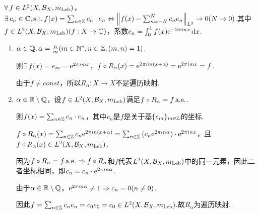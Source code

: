 \begin{instance}
    $\forall\,f\in L^2(X,\mathcal{B}_X,m_\mathrm{Leb})$，$\exists\, c_n\in\mathbb{C},\operatorname{\text{s.t.}} f(x)=\sum_{n\in\mathbb{Z}}{c_n\cdot e_n}\Leftrightarrow \left\|f(x)-\sum_{n=-N}^N{c_n e_n}\right\|_{L^2}\to 0(N\to 0)$.其中$f\in L^2(X,\mathcal{B}_X,m_\mathrm{Leb})(f:X\to\mathbb{C})$，系数$c_n=\int_0^1{f(x)\mathrm{e}^{-2\pi inx}}\mathop{}\!\mathrm{d} x$.\par
    \begin{enumerate}[(1)]
        \item $\alpha\in\mathbb{Q},\alpha=\frac{n}{m}(m\in\mathbb{N}^*,n\in\mathbb{Z},(m,n)=1)$.\par
        则$\exists\, f(x)=e_m=\mathrm{e}^{2\pi imx}$，$f\circ R_\alpha(x)=\mathrm{e}^{2\pi im(x+\alpha)}=\mathrm{e}^{2\pi imx}=f$.\par
        由于$f\neq const$，所以$R_\alpha:X\to X$不是遍历映射.
        \item $\alpha\in\mathbb{R}\setminus\mathbb{Q}$，设$f\in L^2(X,\mathcal{B}_X,m_\mathrm{Leb})$满足$f\circ R_\alpha=f\operatorname{\text{a.e.}}$.\par
        则$f(x)=\sum_{n\in\mathbb{Z}}{c_n\cdot e_n}$，其中$c_n$是$f$是关于基$\{e_m\}_{m\in\mathbb{Z}}$的坐标.\par
        $f\circ R_\alpha(x)=\sum_{n\in\mathbb{Z}}{c_n \mathrm{e}^{2\pi in(x+\alpha)}}=\sum_{n\in\mathbb{Z}}{(c_n \mathrm{e}^{2\pi in\alpha})\cdot \mathrm{e}^{2\pi inx}}$，且$f\circ R_\alpha(x)\in L^2(X,\mathcal{B}_X,m_\mathrm{Leb})$.\par
        因为$f\circ R_\alpha=f\operatorname{\text{a.e.}} \Rightarrow f\circ R_\alpha$和$f$代表$L^2(X,\mathcal{B}_X,m_\mathrm{Leb})$中的同一元素，因此二者坐标相同，即$c_n=c_n\cdot \mathrm{e}^{2\pi in\alpha}$.\par
        由于$\alpha\in\mathbb{R}\setminus\mathbb{Q}$，$\mathrm{e}^{2\pi in\alpha}\neq 1 \Rightarrow c_n=0(n\neq 0)$.\par
        因此$f=\sum_{n\in\mathbb{Z}}{c_ne_n}=c_0e_0=c_0\in L^2(X,\mathcal{B}_X,m_\mathrm{Leb})$.故$R_\alpha$为遍历映射.
    \end{enumerate}
\end{instance}

